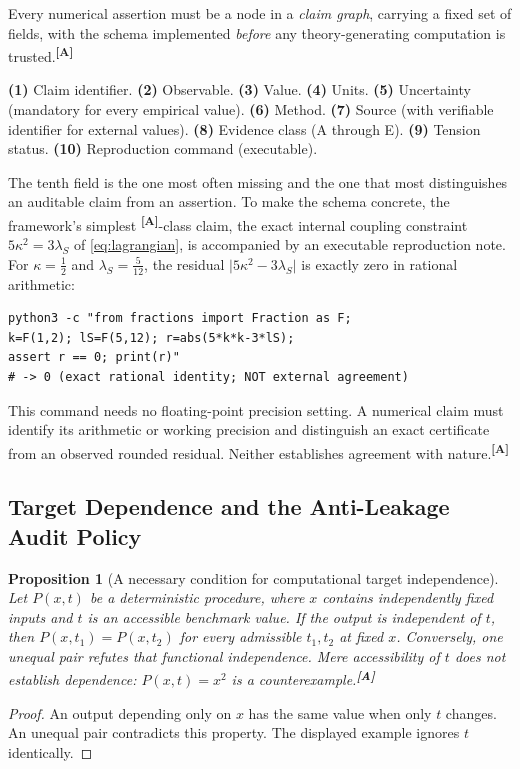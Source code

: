 \documentclass[12pt,a4paper,twoside]{article}
\theoremstyle{plain}
\newtheorem{proposition}[theorem]{Proposition}
\theoremstyle{definition}
\theoremstyle{remark}
\newcommand{\catmark}[1]{\textsuperscript{\textsf{\textbf{[#1]}}}}
\begin{document}
Every numerical assertion must be a node in a \emph{claim graph},
carrying a fixed set of fields, with the schema implemented \emph{before}
any theory-generating computation is trusted.\catmark{A}

\begin{governancebox}
\textbf{(1)} Claim identifier. \quad \textbf{(2)} Observable. \quad
\textbf{(3)} Value. \quad \textbf{(4)} Units. \quad
\textbf{(5)} Uncertainty (mandatory for every empirical value). \quad
\textbf{(6)} Method. \quad \textbf{(7)} Source (with verifiable
identifier for external values). \quad \textbf{(8)} Evidence class (A
through E). \quad \textbf{(9)} Tension status. \quad
\textbf{(10)} Reproduction command (executable).
\end{governancebox}

\noindent The tenth field is the one most often missing and the one that
most distinguishes an auditable claim from an assertion. To make the
schema concrete, the framework's simplest \catmark{A}-class claim, the
exact internal coupling constraint $5\kappa^2 = 3\lambda_S$ of
\cref{eq:lagrangian}, is accompanied by an executable reproduction note.
For $\kappa=\tfrac12$ and $\lambda_S=\tfrac5{12}$, the residual
$\lvert5\kappa^2-3\lambda_S\rvert$ is exactly zero in rational arithmetic:
\begin{verbatim}
python3 -c "from fractions import Fraction as F;
k=F(1,2); lS=F(5,12); r=abs(5*k*k-3*lS);
assert r == 0; print(r)"
# -> 0 (exact rational identity; NOT external agreement)
\end{verbatim}
This command needs no floating-point precision setting. A numerical claim
must identify its arithmetic or working precision and distinguish an exact
certificate from an observed rounded residual. Neither establishes agreement
with nature.\catmark{A}

\subsection{Target Dependence and the Anti-Leakage Audit Policy}
\label{subsec:target-leakage-theorem}

\begin{proposition}[A necessary condition for computational target independence]
\label{prop:target-leakage}
Let $P(x,t)$ be a deterministic procedure, where $x$ contains independently
fixed inputs and $t$ is an accessible benchmark value. If the output is
independent of $t$, then $P(x,t_1)=P(x,t_2)$ for every admissible $t_1,t_2$
at fixed $x$. Conversely, one unequal pair refutes that functional
independence. Mere accessibility of $t$ does not establish dependence:
$P(x,t)=x^2$ is a counterexample.\catmark{A}
\end{proposition}
\begin{proof}
An output depending only on $x$ has the same value when only $t$ changes.
An unequal pair contradicts this property. The displayed example ignores $t$
identically.
\end{proof}
\end{document}
